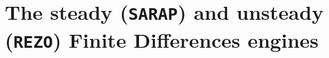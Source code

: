 \section[The F.D. steady and unsteady engines]{The steady (\texttt{SARAP}) and unsteady (\texttt{REZO}) Finite Differences engines}





